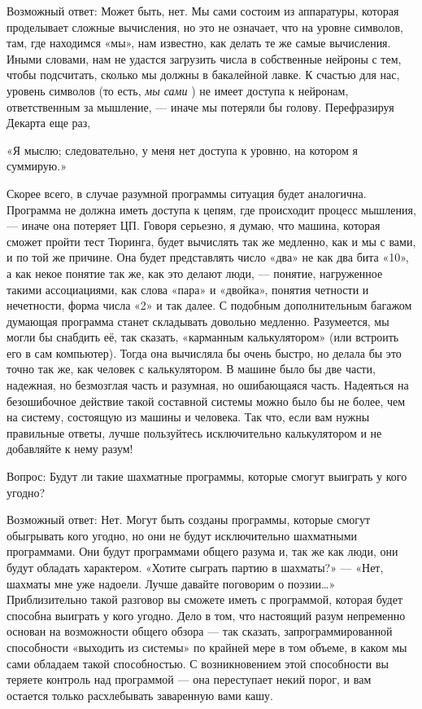 \documentclass[../main.tex]{subfiles}
\begin{document}
Возможный ответ: Может быть, нет. Мы сами состоим из аппаратуры, которая проделывает сложные вычисления, но это не означает, что на уровне символов, там, где находимся «мы», нам известно, как делать те же самые вычисления. Иными словами, нам не удастся загрузить числа в собственные нейроны с тем, чтобы подсчитать, сколько мы должны в бакалейной лавке. К счастью для нас, уровень символов (то есть, \emph{мы сами} ) не имеет доступа к нейронам, ответственным за мышление, --- иначе мы потеряли бы голову. Перефразируя Декарта еще раз,

«Я мыслю; следовательно, у меня нет доступа к уровню, на котором я суммирую.»

Скорее всего, в случае разумной программы ситуация будет аналогична. Программа не должна иметь доступа к цепям, где происходит процесс мышления, --- иначе она потеряет ЦП. Говоря серьезно, я думаю, что машина, которая сможет пройти тест Тюринга, будет вычислять так же медленно, как и мы с вами, и по той же причине. Она будет представлять число «два» не как два бита «10», а как некое понятие так же, как это делают люди, --- понятие, нагруженное такими ассоциациями, как слова «пара» и «двойка», понятия четности и нечетности, форма числа «2» и так далее. С подобным дополнительным багажом думающая программа станет складывать довольно медленно. Разумеется, мы могли бы снабдить её, так сказать, «карманным калькулятором» (или встроить его в сам компьютер). Тогда она вычисляла бы очень быстро, но делала бы это точно так же, как человек с калькулятором. В машине было бы две части, надежная, но безмозглая часть и разумная, но ошибающаяся часть. Надеяться на безошибочное действие такой составной системы можно было бы не более, чем на систему, состоящую из машины и человека. Так что, если вам нужны правильные ответы, лучше пользуйтесь исключительно калькулятором и не добавляйте к нему разум!

Вопрос: Будут ли такие шахматные программы, которые смогут выиграть у кого угодно?

Возможный ответ: Нет. Могут быть созданы программы, которые смогут обыгрывать кого угодно, но они не будут исключительно шахматными программами. Они будут программами общего разума и, так же как люди, они будут обладать характером. «Хотите сыграть партию в шахматы?» --- «Нет, шахматы мне уже надоели. Лучше давайте поговорим о поэзии\ldots» Приблизительно такой разговор вы сможете иметь с программой, которая будет способна выиграть у кого угодно. Дело в том, что настоящий разум непременно основан на возможности общего обзора --- так сказать, запрограммированной способности «выходить из системы» по крайней мере в том объеме, в каком мы сами обладаем такой способностью. С возникновением этой способности вы теряете контроль над программой --- она переступает некий порог, и вам остается только расхлебывать заваренную вами кашу.
\end{document}

